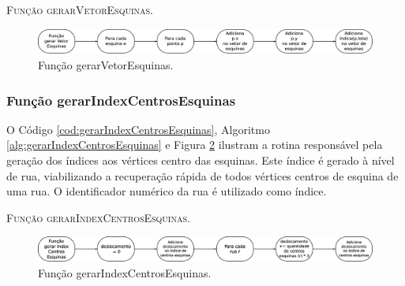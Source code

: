 \begin{algorithm}[H]
   \SetAlgoLined   
   
   \caption{\textsc{Função gerarVetorEsquinas.}}
   \label{alg:gerarVetorEsquinas}
\end{algorithm}

\begin{figure}[H]
  \centering
  \includegraphics[width=1\textwidth]{Figuras/Simula/Fluxos/gerarVetorEsquinas.eps}
  \caption{Função gerarVetorEsquinas.}
  \label{fig:gerarVetorEsquinas}
\end{figure} 

\newpage

\subsubsection{Função gerarIndexCentrosEsquinas}

O Código \ref{cod:gerarIndexCentrosEsquinas}, Algoritmo \ref{alg:gerarIndexCentrosEsquinas} e Figura \ref{fig:gerarIndexCentrosEsquinas} ilustram a rotina responsável pela geração dos índices aos vértices centro das esquinas. Este índice é gerado à nível de rua, viabilizando a recuperação rápida de todos vértices centros de esquina de uma rua. O identificador numérico da rua é utilizado como índice.  



\begin{algorithm}[H]
   \SetAlgoLined   
   
   \caption{\textsc{Função gerarIndexCentrosEsquinas.}}
   \label{alg:gerarIndexCentrosEsquinas}
\end{algorithm}

\begin{figure}[H]
  \centering
  \includegraphics[width=1\textwidth]{Figuras/Simula/Fluxos/gerarIndexCentrosEsquinas.eps}
  \caption{Função gerarIndexCentrosEsquinas.}
  \label{fig:gerarIndexCentrosEsquinas}
\end{figure} 

